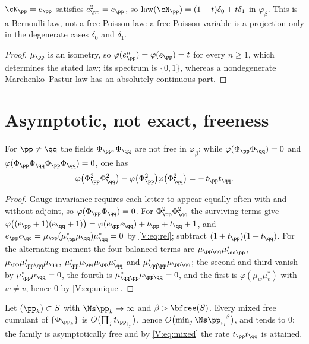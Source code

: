 \begin{theorem}\label{V:thm:bernoulli}
$\cN_\pp=e_\pp$ satisfies $e_\pp^2=e_\pp$, so
$\mathrm{law}(\cN_\pp)=(1-t)\delta_0+t\delta_1$ in $\varphi_\beta$. This is a Bernoulli law,
not a free Poisson law: a free Poisson variable is a projection only in the degenerate cases
$\delta_0$ and $\delta_1$.
\end{theorem}

\begin{proof}
$\mu_\pp$ is an isometry, so $\varphi(e_\pp^n)=\varphi(e_\pp)=t$ for every $n\ge1$, which
determines the stated law; its spectrum is $\{0,1\}$, whereas a nondegenerate
Marchenko--Pastur law has an absolutely continuous part.
\end{proof}

\section{Asymptotic, not exact, freeness}

\begin{theorem}\label{V:thm:notfree}
For $\pp\ne\qq$ the fields $\Phi_\pp,\Phi_\qq$ are not free in $\varphi_\beta$: while
$\varphi(\Phi_\pp\Phi_\qq)=0$ and $\varphi(\Phi_\pp\Phi_\qq\Phi_\pp\Phi_\qq)=0$, one has
\begin{equation}\label{V:eq:mixed}
\varphi\bigl(\Phi_\pp^2\Phi_\qq^2\bigr)-\varphi\bigl(\Phi_\pp^2\bigr)\varphi\bigl(\Phi_\qq^2\bigr)=-\,t_\pp t_\qq .
\end{equation}
\end{theorem}

\begin{proof}
Gauge invariance requires each letter to appear equally often with and without adjoint, so
$\varphi(\Phi_\pp\Phi_\qq)=0$. For $\Phi_\pp^2\Phi_\qq^2$ the surviving terms give
$\varphi\bigl((e_\pp+1)(e_\qq+1)\bigr)=\varphi(e_\pp e_\qq)+t_\pp+t_\qq+1$, and
$e_\pp e_\qq=\mu_\pp(\mu_\pp^*\mu_\qq)\mu_\qq^*=0$ by \eqref{V:eq:rel}; subtract
$(1+t_\pp)(1+t_\qq)$. For the alternating moment the four balanced terms are
$\mu_{\pp\qq}\mu_{\qq\pp}^*$, $\mu_\pp\mu_{\pp\qq}^*\mu_\qq$,
$\mu_\pp^*\mu_\qq\mu_\pp\mu_\qq^*$ and $\mu_{\qq\pp}^*\mu_{\pp\qq}$; the second and third
vanish by $\mu_\pp^*\mu_\qq=0$, the fourth is $\mu_{\qq\pp}^*\mu_{\pp\qq}=0$, and the
first is $\varphi(\mu_w\mu_v^*)$ with $w\ne v$, hence $0$ by \eqref{V:eq:unique}.
\end{proof}

\begin{corollary}\label{V:cor:asympfree}
Let $(\pp_k)\subset S$ with $\Ns\pp_k\to\infty$ and $\beta>\bfree(S)$. Every mixed free
cumulant of $\{\Phi_{\pp_k}\}$ is $O\bigl(\prod_jt_{\pp_{i_j}}\bigr)$, hence
$O\bigl(\min_j\Ns\pp_{i_j}^{-\beta}\bigr)$, and tends to $0$; the family is asymptotically
free and by \eqref{V:eq:mixed} the rate $t_\pp t_\qq$ is attained.
\end{corollary}

